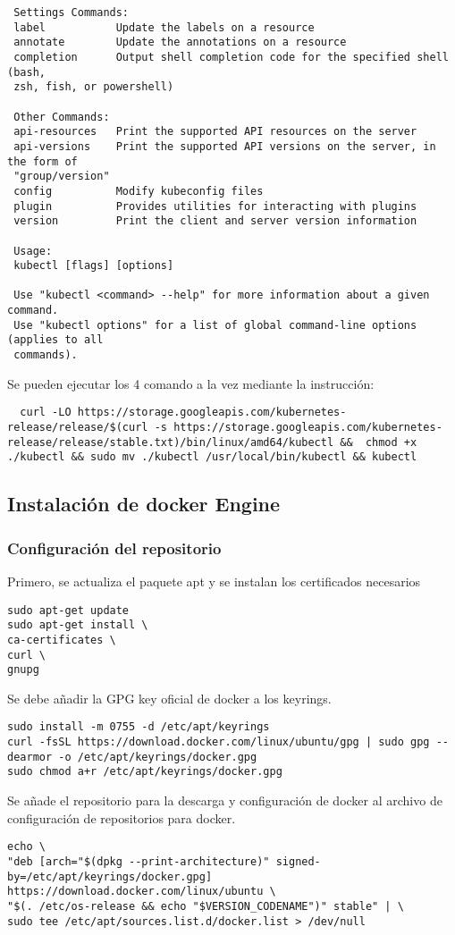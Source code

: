 \documentclass[../main.tex]{subfiles}
\begin{document}
\begin{lstlisting}
 Settings Commands:
 label           Update the labels on a resource
 annotate        Update the annotations on a resource
 completion      Output shell completion code for the specified shell (bash,
 zsh, fish, or powershell)
 
 Other Commands:
 api-resources   Print the supported API resources on the server
 api-versions    Print the supported API versions on the server, in the form of
 "group/version"
 config          Modify kubeconfig files
 plugin          Provides utilities for interacting with plugins
 version         Print the client and server version information
 
 Usage:
 kubectl [flags] [options]
 
 Use "kubectl <command> --help" for more information about a given command.
 Use "kubectl options" for a list of global command-line options (applies to all
 commands).
 \end{lstlisting}
 
Se pueden ejecutar los 4 comando a la vez mediante la instrucción:
\begin{lstlisting} 
  curl -LO https://storage.googleapis.com/kubernetes-release/release/$(curl -s https://storage.googleapis.com/kubernetes-release/release/stable.txt)/bin/linux/amd64/kubectl &&  chmod +x ./kubectl && sudo mv ./kubectl /usr/local/bin/kubectl && kubectl
\end{lstlisting}
\subsection{Instalación de docker Engine}
\subsubsection{Configuración del repositorio}
Primero, se actualiza el paquete apt y se instalan los certificados necesarios
\begin{lstlisting} 
sudo apt-get update
sudo apt-get install \
ca-certificates \
curl \
gnupg
\end{lstlisting} 

Se debe añadir la GPG key oficial de docker a los keyrings.
\begin{lstlisting}
sudo install -m 0755 -d /etc/apt/keyrings
curl -fsSL https://download.docker.com/linux/ubuntu/gpg | sudo gpg --dearmor -o /etc/apt/keyrings/docker.gpg
sudo chmod a+r /etc/apt/keyrings/docker.gpg
\end{lstlisting}

Se añade el repositorio para la descarga y configuración de docker al archivo de configuración de repositorios para docker.
\begin{lstlisting}
echo \
"deb [arch="$(dpkg --print-architecture)" signed-by=/etc/apt/keyrings/docker.gpg] https://download.docker.com/linux/ubuntu \
"$(. /etc/os-release && echo "$VERSION_CODENAME")" stable" | \
sudo tee /etc/apt/sources.list.d/docker.list > /dev/null 
\end{lstlisting}
\end{document}
